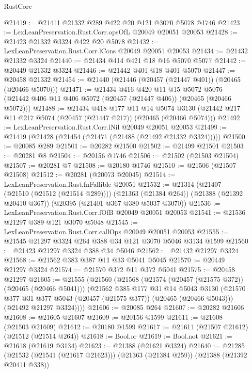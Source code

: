 \begin{lexlean}{RustCore}
\begin{coremodule}
@21419 := @21411 @21332 @289 @422 @20 @121 @3070 @5078 @1746
@21423 := LexLeanPreservation.Rust.Corr.opsOfL @20049 @20051 @20053
@21428 := @21423 @21332 @3324 @422 @20 @5078
@21432 := LexLeanPreservation.Rust.Corr.lCons @20049 @20051 @20053
@21434 := @21432 @21332 @3324
@21440 := @21434 @414 @421 @18 @16 @5070 @5077
@21442 := @20449 @21332 @3324
@21446 := @21442 @401 @18 @401 @5070
@21447 := @20458 @21332
@21454 := @21440 (@21446 (@20457 (@21447 @401)) (@20465 (@20466 @5070)))
@21471 := @21434
    @416
    @420
    @11
    @15
    @5072
    @5076
    (@21442 @406 @11 @406 @5072 (@20457 (@21447 @406)) (@20465 (@20466 @5072)))
@21488 := @21434
    @418
    @177
    @11
    @14
    @5074
    @3130
    (@21442 @217 @11 @217 @5074 (@20457 (@21447 @217)) (@20465 (@20466 @5074)))
@21492 := LexLeanPreservation.Rust.Corr.lNil @20049 @20051 @20053
@21499 := @21419 (@21428 (@21454 (@21471 (@21488 (@21492 @21332 @3324)))))
@21500 := @20085 @289
@21501 := @20282 @21500
@21502 := @21499 @21501
@21503 := @20281 @8
@21504 := @20156 @1746
@21506 := @21502 (@21503 @21504)
@21507 := @20281 @7
@21508 := @20180 @1746
@21510 := @21506 (@21507 @21508)
@21512 := @20281 (@20073 @20045)
@21514 := LexLeanPreservation.Rust.fnFallible @20051
@21532 := @21314
    (@21407 (@21510 (@21512 (@21514 @289))))
    (@21363 (@21384 @264))
    (@21388 (@21392 @20410 @367))
    (@20395 (@21401 @367 @380 @5037 @3070))
@21536 := LexLeanPreservation.Rust.Corr.fOfB @20049 @20051 @20053
@21541 := @21536 @21297 @389 @121 @3070 @5048
@21545 := LexLeanPreservation.Rust.Corr.callOps @20049 @20051 @20053
@21555 := @21545 @21297 @3324 @264 @388 @34 @121 @3070 @5046 @3134 @1599
@21560 := @21423 @21297 @3324 @388 @34 @5046
@21562 := @21432 @21297 @3324
@21568 := @21562 @383 @387 @11 @33 @5041 @5045
@21570 := @20449 @21297 @3324
@21574 := @21570 @372 @11 @372 @5041
@21575 := @20458 @21297
@21605 := @21555
    (@21560
      (@21568
        (@21574 (@20457 (@21575 @372)) (@20465 (@20466 @5041)))
        (@21562
          @385
          @177
          @31
          @14
          @5043
          @3130
          (@21570 @377 @31 @377 @5043 (@20457 (@21575 @377)) (@20465 (@20466 @5043)))
          (@21492 @21297 @3324))))
@21606 := @20085 @264
@21607 := @20282 @21606
@21608 := @21605 @21607
@21609 := @20156 @1599
@21611 := @21608 (@21503 @21609)
@21612 := @20180 @1599
@21617 := @21611 (@21507 @21612) (@21512 (@21514 @264))
@21618 := Bool.or
@21619 := Bool.not
@21621 := @21618 (@21619 @3134)
@21623 := @21388 (@21621 @3324)
@21640 := @21285
    (@21532 (@21541 (@21617 @21623)))
    (@21363 (@21384 @259))
    (@21388 (@21392 @20411 @338))

\end{coremodule}
\end{lexlean}
